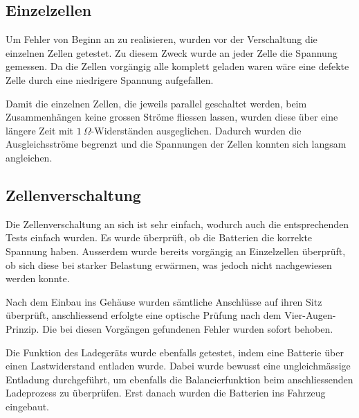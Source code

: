 \subsection{Einzelzellen}
Um Fehler von Beginn an zu realisieren, wurden vor der Verschaltung die einzelnen Zellen getestet. Zu diesem Zweck wurde an jeder Zelle die Spannung gemessen. Da die Zellen vorgängig alle komplett geladen waren wäre eine defekte Zelle durch eine niedrigere Spannung aufgefallen.

Damit die einzelnen Zellen, die jeweils parallel geschaltet werden, beim Zusammenhängen keine grossen Ströme fliessen lassen, wurden diese über eine längere Zeit mit $1\ \Omega$-Widerständen ausgeglichen. Dadurch wurden die Ausgleichsströme begrenzt und die Spannungen der Zellen konnten sich langsam angleichen.

\subsection{Zellenverschaltung}
Die Zellenverschaltung an sich ist sehr einfach, wodurch auch die entsprechenden Tests einfach wurden. Es wurde überprüft, ob die Batterien die korrekte Spannung haben. Ausserdem wurde bereits vorgängig an Einzelzellen überprüft, ob sich diese bei starker Belastung erwärmen, was jedoch nicht nachgewiesen werden konnte.

Nach dem Einbau ins Gehäuse wurden sämtliche Anschlüsse auf ihren Sitz überprüft, anschliessend erfolgte eine optische Prüfung nach dem Vier-Augen-Prinzip. Die bei diesen Vorgängen gefundenen Fehler wurden sofort behoben.

Die Funktion des Ladegeräts wurde ebenfalls getestet, indem eine Batterie über einen Lastwiderstand entladen wurde. Dabei wurde bewusst eine ungleichmässige Entladung durchgeführt, um ebenfalls die Balancierfunktion beim anschliessenden Ladeprozess zu überprüfen. Erst danach wurden die Batterien ins Fahrzeug eingebaut.


\newpage